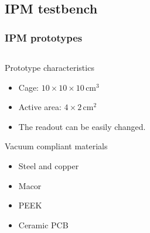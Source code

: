\subsection{IPM testbench}
\begin{frame}[t]
  \frametitle{IPM prototypes}
  \begin{columns}
    \begin{column}{0.45\textwidth}
      \begin{block}{Prototype characteristics}
        \begin{itemize}
          \item Cage: $10\times10\times10\,\mathrm{cm^3}$
          \item Active area: $4\times2\,\mathrm{cm^2}$
          \item The readout can be easily changed.
        \end{itemize}
      \end{block}

      \begin{block}{Vacuum compliant materials}
        \begin{itemize}
          \item Steel and copper
          \item Macor
          \item PEEK
          \item Ceramic PCB
        \end{itemize}
      \end{block}


\end{column}
\end{columns}
\end{frame}

